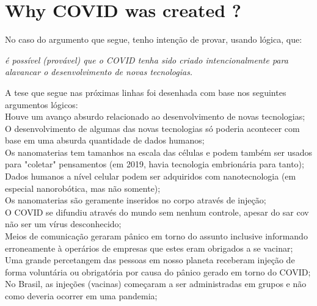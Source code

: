 \documentclass[11pt]{book}
\begin{document}
\chapter{Why COVID was created ?}

No caso do argumento que segue, tenho intenção de provar, usando lógica, que: \\

\noindent \begin{center} \emph{é possível (provável) que o COVID tenha sido criado intencionalmente para alavancar o desenvolvimento de novas tecnologias.} \end{center}

A tese que segue nas próximas linhas foi desenhada com base nos seguintes argumentos lógicos: \\

Houve um avanço absurdo relacionado ao desenvolvimento de novas tecnologias; \\

O desenvolvimento de algumas das novas tecnologias só poderia acontecer com base em uma absurda quantidade de dados humanos; \\

Os nanomaterias tem tamanhos na escala das células e podem também ser usados para "coletar" pensamentos (em 2019, havia tecnologia embrionária para tanto); \\

Dados humanos a nível celular podem ser adquiridos com nanotecnologia (em especial nanorobótica, mas não somente); \\

Os nanomaterias são geramente inseridos no corpo através de injeção; \\

O COVID se difundiu através do mundo sem nenhum controle, apesar do sar cov não ser um vírus desconhecido; \\

Meios de comunicação geraram pânico em torno do assunto inclusive informando erroneamente à operários de empresas que estes eram obrigados a se vacinar; \\

Uma grande percetangem das pessoas em nosso planeta receberam injeção de forma voluntária ou obrigatória por causa do pânico gerado em torno do COVID; \\

No Brasil, as injeções (vacinas) começaram a ser administradas em grupos e não como deveria ocorrer em uma pandemia; \\
\end{document}
